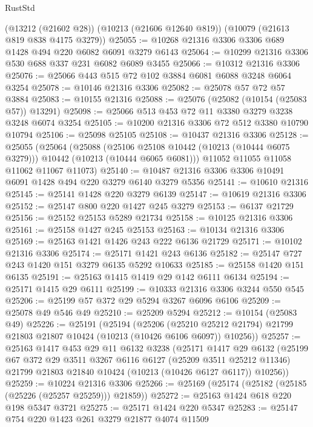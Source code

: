 \begin{lexlean}{RustStd}
\begin{coremodule}
    (@13212 (@21602 @28))
    (@10213 (@21606 @12640 @819))
    (@10079 (@21613 @819 @838 @4175 @3279))
@25055 := @10268 @21316 @3306 @3306 @689 @1428 @494 @220 @6082 @6091 @3279 @6143
@25064 := @10299 @21316 @3306 @530 @688 @337 @231 @6082 @6089 @3455
@25066 := @10312 @21316 @3306
@25076 := @25066 @443 @515 @72 @102 @3884 @6081 @6088 @3248 @6064 @3254
@25078 := @10146 @21316 @3306
@25082 := @25078 @57 @72 @57 @3884
@25083 := @10155 @21316
@25088 := @25076 (@25082 (@10154 (@25083 @57)) @13291)
@25098 := @25066 @513 @453 @72 @11 @3380 @3279 @3238 @3248 @6074 @3254
@25105 := @10200 @21316 @3306 @72 @512 @3380 @10790 @10794
@25106 := @25098 @25105
@25108 := @10437 @21316 @3306
@25128 := @25055
    (@25064
      (@25088
        (@25106 @25108 @10442 (@10213 (@10444 @6075 @3279)))
        @10442
        (@10213 (@10444 @6065 @6081)))
      @11052
      @11055
      @11058
      @11062
      @11067
      @11073)
@25140 := @10487 @21316 @3306 @3306 @10491 @6091 @1428 @494 @220 @3279 @6140 @3279 @5356
@25141 := @10610 @21316
@25145 := @25141 @1428 @220 @3279 @6139
@25147 := @10619 @21316 @3306
@25152 := @25147 @800 @220 @1427 @245 @3279
@25153 := @6137 @21729
@25156 := @25152 @25153 @5289 @21734
@25158 := @10125 @21316 @3306
@25161 := @25158 @1427 @245 @25153
@25163 := @10134 @21316 @3306
@25169 := @25163 @1421 @1426 @243 @222 @6136 @21729
@25171 := @10102 @21316 @3306
@25174 := @25171 @1421 @243 @6136
@25182 := @25147 @727 @243 @1420 @151 @3279 @6135 @5292 @10633
@25185 := @25158 @1420 @151 @6135
@25191 := @25163 @1415 @1419 @29 @142 @6111 @6134
@25194 := @25171 @1415 @29 @6111
@25199 := @10333 @21316 @3306 @3244 @550 @545
@25206 := @25199 @57 @372 @29 @5294 @3267 @6096 @6106
@25209 := @25078 @49 @546 @49
@25210 := @25209 @5294
@25212 := @10154 (@25083 @49)
@25226 := @25191
    (@25194
      (@25206
        (@25210 @25212 @21794)
        @21799
        @21803
        @21807
        @10424
        (@10213 (@10426 @6106 @6097))
        @10256))
@25257 := @25163
    @1417
    @453
    @29
    @11
    @6132
    @3238
    (@25171
      @1417
      @29
      @6132
      (@25199
        @67
        @372
        @29
        @3511
        @3267
        @6116
        @6127
        (@25209 @3511 @25212 @11346)
        @21799
        @21803
        @21840
        @10424
        (@10213 (@10426 @6127 @6117))
        @10256))
@25259 := @10224 @21316 @3306
@25266 := @25169 (@25174 (@25182 (@25185 (@25226 (@25257 @25259))) @21859))
@25272 := @25163 @1424 @618 @220 @198 @5347 @3721
@25275 := @25171 @1424 @220 @5347
@25283 := @25147 @754 @220 @1423 @261 @3279 @21877 @4074 @11509

\end{coremodule}
\end{lexlean}
